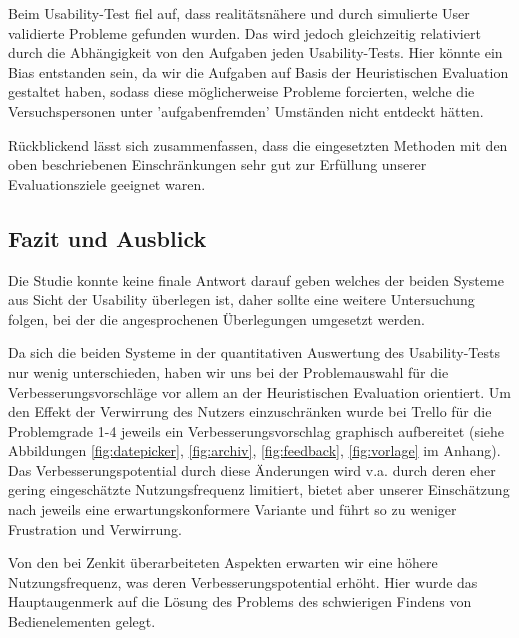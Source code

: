 Beim Usability-Test fiel auf, dass realitätsnähere und durch simulierte User validierte Probleme gefunden wurden. Das wird jedoch gleichzeitig relativiert durch die Abhängigkeit von den Aufgaben jeden Usability-Tests. Hier könnte ein Bias entstanden sein, da wir die Aufgaben auf Basis der Heuristischen Evaluation gestaltet haben, sodass diese möglicherweise Probleme forcierten, welche die Versuchspersonen unter 'aufgabenfremden' Umständen nicht entdeckt hätten.

Rückblickend lässt sich zusammenfassen, dass die eingesetzten Methoden mit den oben beschriebenen Einschränkungen sehr gut zur Erfüllung unserer Evaluationsziele geeignet waren.


\subsection{Fazit und Ausblick}
Die Studie konnte keine finale Antwort darauf geben welches der beiden Systeme aus Sicht der Usability überlegen ist, daher sollte eine weitere Untersuchung folgen, bei der die angesprochenen Überlegungen umgesetzt werden.

Da sich die beiden Systeme in der quantitativen Auswertung des Usability-Tests nur wenig unterschieden, haben wir uns bei der Problemauswahl für die Verbesserungsvorschläge vor allem an der Heuristischen Evaluation orientiert. Um den Effekt der Verwirrung des Nutzers einzuschränken wurde bei Trello für die Problemgrade 1-4 jeweils ein Verbesserungsvorschlag graphisch aufbereitet (siehe Abbildungen \ref{fig:datepicker}, \ref{fig:archiv}, \ref{fig:feedback}, \ref{fig:vorlage} im Anhang). Das Verbesserungspotential durch diese Änderungen wird v.a. durch deren eher gering eingeschätzte Nutzungsfrequenz limitiert, bietet aber unserer Einschätzung nach jeweils eine erwartungskonformere Variante und führt so zu weniger Frustration und Verwirrung.

Von den bei Zenkit überarbeiteten Aspekten erwarten wir eine höhere Nutzungsfrequenz, was deren Verbesserungspotential erhöht. Hier wurde das Hauptaugenmerk auf die Lösung des Problems des schwierigen Findens von Bedienelementen gelegt.